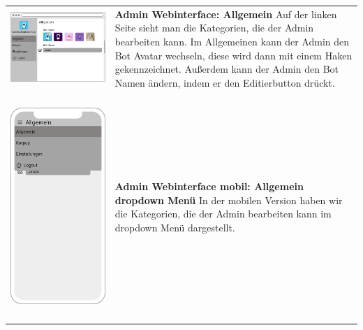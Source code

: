 \begin{tabular}{C{6cm}  L{7cm}}
    \includegraphics[width=\linewidth]{bilder/new vers. UI Design/Allgemein/Allgemein.png} & \textbf{Admin Webinterface: Allgemein} \newline 
    Auf der linken Seite sieht man die Kategorien, die der Admin bearbeiten kann. Im Allgemeinen kann
    der Admin den Bot Avatar wechseln, diese wird dann mit einem Haken gekennzeichnet. Außerdem kann
    der Admin den Bot Namen ändern, indem er den Editierbutton drückt. \\
    \includegraphics[width=5cm,height=8.5cm]{bilder/new vers. UI Design/Allgemein/iPhone X Allgemein dropdown.png} & \textbf{Admin Webinterface mobil: Allgemein dropdown Menü} \newline 
    In der mobilen Version haben wir die Kategorien, die der Admin bearbeiten kann im dropdown Menü dargestellt. \\

\end{tabular}
